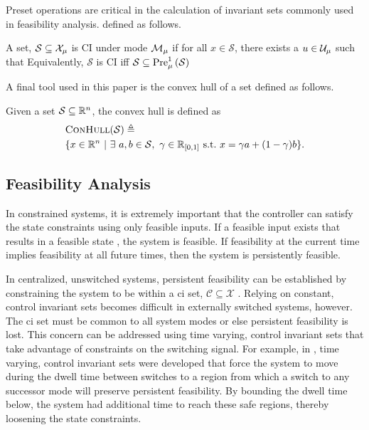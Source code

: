 Preset operations are critical in the calculation of invariant sets commonly used in feasibility analysis.  defined as follows.
\begin{definition}\label{def:ci_set}
A set, $\mathcal{S}\subseteq\xcon[\modeidx]$ is CI under mode $\mode{\modeidx}$ if for all $x\in\mathcal{S}$, there exists a $u\in\ucon[\modeidx]$ such that  Equivalently, $\mathcal{S}$ is CI iff $\mathcal{S}\subseteq\Pre[\modeidx][1]{\mathcal{S}}$
\end{definition}

A final tool used in this paper is the convex hull of a set defined as follows.
\begin{definition}
Given a set $\mathcal{S}\subseteq\mathbb{R}^n$, the convex hull is defined as 
\begin{align*}
&\Call{ConHull}{\mathcal{S}}\triangleq\\&\{x\in\real^n\ |\ \exists\ a,b\in\mathcal{S},\ \gamma\in\real\rii{0}{1}\ \text{s.t.}\ x=\gamma a + (1-\gamma)b\}.
\end{align*}
\end{definition}
\subsection{Feasibility Analysis}
In constrained systems, it is extremely important that the controller can satisfy the state constraints using only feasible inputs. If a feasible input exists that results in a feasible state , the system is feasible. If feasibility at the current time implies feasibility at all future times, then the system is persistently feasible.

In centralized, unswitched systems, persistent feasibility can be established by constraining the system to be within a \ac{ci} set, $\mathcal{C}\subseteq\mathcal{X}$ \cite{Blanchini1999}. Relying on constant, control invariant sets becomes difficult in externally switched systems, however. The \ac{ci} set must be common to all system modes or else persistent feasibility is lost. This concern can be addressed using time varying, control invariant sets that take advantage of constraints on the switching signal. For example, in \cite{Danielson2019,Santis2004,Lavaei2021}, time varying, control invariant sets were developed that force the system to move during the dwell time between switches to a region from which a switch to any successor mode will preserve persistent feasibility. By bounding the dwell time below, the system had additional time to reach these safe regions, thereby loosening the state constraints.

